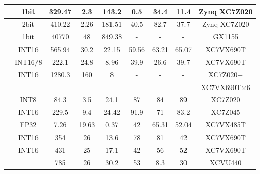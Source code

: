 \begin{table}[htbp]
\begin{tabular}{|r|c|c|c|c|c|c|c|c|}
            \cite{nakahara2017fully} & 1bit  & 329.47 & 2.3   & 143.2 & 0.5   & 34.4  & 11.4  & Zynq XC7Z020 \\ \hline
            \cite{jiao2017accelerating} & 2bit  & 410.22 & 2.26  & 181.51 & 40.5  & 82.7  & 37.7  & Zynq XC7Z020 \\ \hline
            \cite{moss2017high} & 1bit  & 40770 & 48    & 849.38 &   -   &   -   &   -   & GX1155 \\ \hline
            \cite{li2016high} & INT16 & 565.94 & 30.2  & 22.15 & 59.56 & 63.21 & 65.07 & XC7VX690T \\ \hline
            \cite{liu2016automatic} & INT16/8 & 222.1 & 24.8  & 8.96  & 39.9  & 26.6  & 39.7  & XC7VX690T \\ \hline
        \multicolumn{1}{|c|}{\multirow{2}[0]{*}{\cite{zhang2016energy}}} & \multirow{2}[0]{*}{INT16} & \multirow{2}[0]{*}{1280.3} & \multirow{2}[0]{*}{160} & \multirow{2}[0]{*}{8} & \multirow{2}[0]{*}{-} & \multirow{2}[0]{*}{-} & \multirow{2}[0]{*}{-} & XC7Z020+ \\
        \multicolumn{1}{|c|}{} &       &       &       &       &       &       &       & XC7VX690T$\times$6 \\ \hline
            \cite{guo2017angel} & INT8  & 84.3  & 3.5   & 24.1  & 87    & 84    & 89    & XC7Z020 \\ \hline
            \cite{xiao2017exploring} & INT16 & 229.5 & 9.4   & 24.42 & 91.9  & 71    & 83.2  & XC7Z045 \\ \hline
            \cite{guan2017fpga} & FP32  & 7.26  & 19.63 & 0.37  & 42    & 65.31 & 52.04 & XC7VX485T \\ \hline
            \cite{zhang2016caffeine} & INT16 & 354   & 26    & 13.6  & 78    & 81    & 42    & XC7VX690T \\ \hline
            \multirow{2}[2]{*}{\cite{Shen2018Towards}} & \multirow{2}[2]{*}{INT16} & 431  & 25 & 17.1  & 42 & 56 & 52    & XC7VX690T \\ \cline{3-8}    
             &  & 785 & 26 & 30.2 & 53 & 8.3  & 30 & XCVU440 \\ \hline
        \end{tabular}%
    \label{tab:hardware_list}%
  \end{table}%